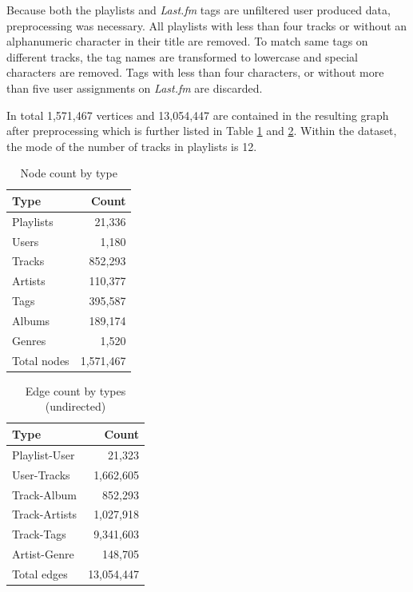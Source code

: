 \documentclass[sigconf]{acmart}
\begin{document}
Because both the playlists and \emph{Last.fm} tags are unfiltered user produced data, preprocessing was necessary. All playlists with less than four tracks or without an alphanumeric character in their title are removed. To match same tags on different tracks, the tag names are transformed to lowercase and special characters are removed. Tags with less than four characters, or without more than five user assignments on \emph{Last.fm} are discarded.

In total 1,571,467 vertices and 13,054,447 are contained in the resulting graph after preprocessing which is further listed in Table \ref{table:node_count} and \ref{table:edge_count}. Within the dataset, the mode of the number of tracks in playlists is 12.

\begin{table}[H]
	\caption{Node count by type}
	\label{table:node_count}
	\begin{tabular}{lr}
		\midrule 
		\textbf{Type} & \textbf{Count} \\ 
		\midrule 
		Playlists & 21,336  \\
		Users     & 1,180     \\
		Tracks    & 852,293 \\
		Artists   & 110,377  \\
		Tags      & 395,587    \\
		Albums    & 189,174    \\
		Genres	  & 1,520	\\
		\midrule 
		Total nodes & 1,571,467\\
		\bottomrule
	\end{tabular}
\end{table}

\begin{table}[H]
	\caption{Edge count by types (undirected)}
	\label{table:edge_count}
	\begin{tabular}{lr}
		\midrule 
		\textbf{Type} & \textbf{Count} \\ 
		\midrule 
		Playlist-User   & 21,323  \\
		User-Tracks     & 1,662,605     \\
		Track-Album		& 852,293 \\
		Track-Artists   & 1,027,918 \\
		Track-Tags   	& 9,341,603 \\
		Artist-Genre	& 148,705  \\
		\midrule 
		Total edges 	& 13,054,447\\
		\bottomrule
	\end{tabular}
\end{table}
\end{document}
